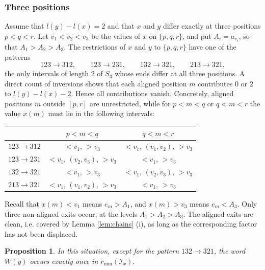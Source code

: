 \documentclass[a4paper,12pt,leqno]{amsart}
\newcommand{\caI}{\mathcal{I}}
\theoremstyle{plain}
\newtheorem{prop}[thm]{Proposition}
\theoremstyle{definition}
\theoremstyle{definition}
\begin{document}
\subsubsection{Three positions} Assume that $l(y)-l(x)=2$ and that $x$ and $y$ differ exactly at
three positions $p<q<r$. Let $v_1<v_2<v_3$ be the values of $x$ on $\{p,q,r\}$, and put
$A_i=a_{v_i}$, so that $A_1>A_2>A_3$. The restrictions of $x$ and $y$ to $\{p,q,r\}$ have one of the patterns
\[123\rightarrow312,\qquad 123\rightarrow231,\qquad 132\rightarrow321,\qquad 213\rightarrow321,\]
the only intervals of length $2$ of $S_3$ whose ends differ at all three positions. A direct count
of inversions shows that each aligned position $m$ contributes $0$ or $2$ to $l(y)-l(x)-2$. Hence
all contributions vanish. Concretely, aligned positions $m$ outside $[p,r]$ are unrestricted, while
for $p<m<q$ or $q<m<r$ the value $x(m)$ must lie in the following intervals:
\begin{center}
\begin{tabular}{c|c|c}
 & $p<m<q$ & $q<m<r$\\ \hline
$123\rightarrow312$ & $<v_1$, $>v_3$ & $<v_1$, $(v_1,v_2)$, $>v_3$\\
$123\rightarrow231$ & $<v_1$, $(v_2,v_3)$, $>v_3$ & $<v_1$, $>v_3$\\
$132\rightarrow321$ & $<v_1$, $>v_3$ & $<v_1$, $(v_2,v_3)$, $>v_3$\\
$213\rightarrow321$ & $<v_1$, $(v_1,v_2)$, $>v_3$ & $<v_1$, $>v_3$
\end{tabular}
\end{center}
Recall that $x(m)<v_1$ means $e_m>A_1$, and $x(m)>v_3$ means $e_m<A_3$. Only three non-aligned
exits occur, at the levels $A_1>A_2>A_3$. The aligned exits are clean, i.e. covered by Lemma
\ref{lem:chains} (i), as long as the corresponding factor has not been displaced.

\begin{prop}\label{prop:threepos} In this situation, except for the pattern $132\rightarrow321$,
the word $W(y)$ occurs exactly once in $r_{\min}(\caI_x)$.
\end{prop}
\end{document}
